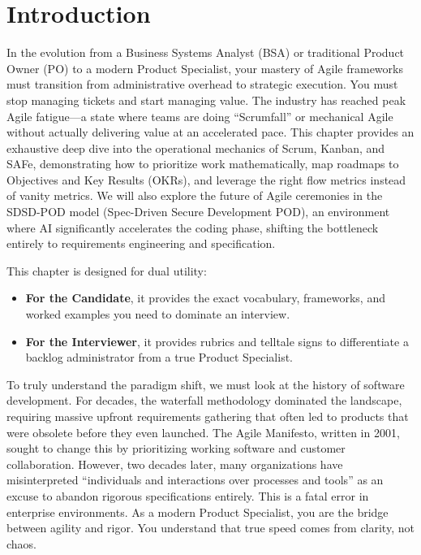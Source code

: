 \documentclass[
  11pt,
  openany,
  oneside]{book}
\providecommand{\tightlist}{%
  \setlength{\itemsep}{0pt}\setlength{\parskip}{0pt}}
\begin{document}
\section{Introduction}\label{introduction}

In the evolution from a Business Systems Analyst (BSA) or traditional
Product Owner (PO) to a modern Product Specialist, your mastery of Agile
frameworks must transition from administrative overhead to strategic
execution. You must stop managing tickets and start managing value. The
industry has reached peak Agile fatigue---a state where teams are doing
``Scrumfall'' or mechanical Agile without actually delivering value at
an accelerated pace. This chapter provides an exhaustive deep dive into
the operational mechanics of Scrum, Kanban, and SAFe, demonstrating how
to prioritize work mathematically, map roadmaps to Objectives and Key
Results (OKRs), and leverage the right flow metrics instead of vanity
metrics. We will also explore the future of Agile ceremonies in the
SDSD-POD model (Spec-Driven Secure Development POD), an environment
where AI significantly accelerates the coding phase, shifting the
bottleneck entirely to requirements engineering and specification.

This chapter is designed for dual utility:

\begin{itemize}
\tightlist
\item
  \textbf{For the Candidate}, it provides the exact vocabulary,
  frameworks, and worked examples you need to dominate an interview.
\item
  \textbf{For the Interviewer}, it provides rubrics and telltale signs
  to differentiate a backlog administrator from a true Product
  Specialist.
\end{itemize}

To truly understand the paradigm shift, we must look at the history of
software development. For decades, the waterfall methodology dominated
the landscape, requiring massive upfront requirements gathering that
often led to products that were obsolete before they even launched. The
Agile Manifesto, written in 2001, sought to change this by prioritizing
working software and customer collaboration. However, two decades later,
many organizations have misinterpreted ``individuals and interactions
over processes and tools'' as an excuse to abandon rigorous
specifications entirely. This is a fatal error in enterprise
environments. As a modern Product Specialist, you are the bridge between
agility and rigor. You understand that true speed comes from clarity,
not chaos.
\end{document}
